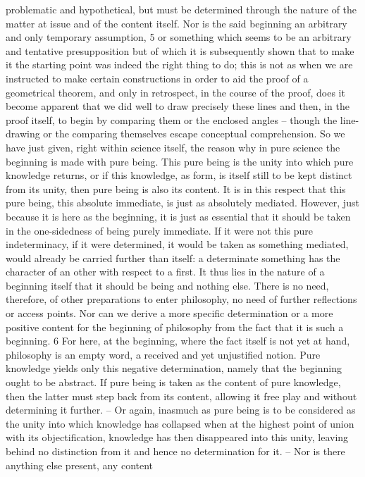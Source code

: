 problematic and hypothetical, but must be determined through the nature
of the matter at issue and of the content itself. Nor is the said beginning an
arbitrary and only temporary assumption, 5 or something which seems to
be an arbitrary and tentative presupposition but of which it is subsequently
shown that to make it the starting point was indeed the right thing to do;
this is not as when we are instructed to make certain constructions in order
to aid the proof of a geometrical theorem, and only in retrospect, in the
course of the proof, does it become apparent that we did well to draw
precisely these lines and then, in the proof itself, to begin by comparing
them or the enclosed angles – though the line-drawing or the comparing
themselves escape conceptual comprehension.
So we have just given, right within science itself, the reason why in pure
science the beginning is made with pure being. This pure being is the unity
into which pure knowledge returns, or if this knowledge, as form, is itself
still to be kept distinct from its unity, then pure being is also its content.
It is in this respect that this pure being, this absolute immediate, is just as
absolutely mediated. However, just because it is here as the beginning, it is
just as essential that it should be taken in the one-sidedness of being purely
immediate. If it were not this pure indeterminacy, if it were determined, it
would be taken as something mediated, would already be carried further
than itself: a determinate something has the character of an other with
respect to a first. It thus lies in the nature of a beginning itself that it should
be being and nothing else. There is no need, therefore, of other preparations
to enter philosophy, no need of further reflections or access points.
Nor can we derive a more specific determination or a more positive content
for the beginning of philosophy from the fact that it is such a beginning. 6
For here, at the beginning, where the fact itself is not yet at hand, philosophy
is an empty word, a received and yet unjustified notion. Pure knowledge
yields only this negative determination, namely that the beginning ought
to be abstract. If pure being is taken as the content of pure knowledge,
then the latter must step back from its content, allowing it free play and
without determining it further. – Or again, inasmuch as pure being is
to be considered as the unity into which knowledge has collapsed when
at the highest point of union with its objectification, knowledge has then
disappeared into this unity, leaving behind no distinction from it and hence
no determination for it. – Nor is there anything else present, any content
